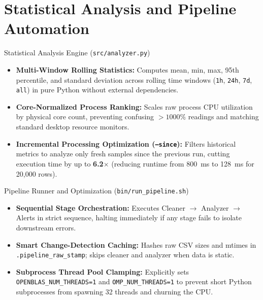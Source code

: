 \section{Statistical Analysis and Pipeline Automation}

\begin{frame}{Statistical Analysis Engine (\texttt{src/analyzer.py})}
    \begin{itemize}
        \setlength{\itemsep}{10pt}
        \item \textbf{Multi-Window Rolling Statistics:} Computes mean, min, max, 95th percentile, and standard deviation across rolling time windows (\texttt{1h}, \texttt{24h}, \texttt{7d}, \texttt{all}) in pure Python without external dependencies.
        \item \textbf{Core-Normalized Process Ranking:} Scales raw process CPU utilization by physical core count, preventing confusing $>1000\%$ readings and matching standard desktop resource monitors.
        \item \textbf{Incremental Processing Optimization (\texttt{--since}):} Filters historical metrics to analyze only fresh samples since the previous run, cutting execution time by up to \textbf{6.2$\times$} (reducing runtime from 800~ms to 128~ms for 20,000 rows).
    \end{itemize}
\end{frame}

\begin{frame}{Pipeline Runner and Optimization (\texttt{bin/run\_pipeline.sh})}
    \begin{itemize}
        \setlength{\itemsep}{10pt}
        \item \textbf{Sequential Stage Orchestration:} Executes Cleaner $\rightarrow$ Analyzer $\rightarrow$ Alerts in strict sequence, halting immediately if any stage fails to isolate downstream errors.
        \item \textbf{Smart Change-Detection Caching:} Hashes raw CSV sizes and mtimes in \texttt{.pipeline\_raw\_stamp}; skips cleaner and analyzer when data is static.
        \item \textbf{Subprocess Thread Pool Clamping:} Explicitly sets \texttt{OPENBLAS\_NUM\_THREADS=1} and \texttt{OMP\_NUM\_THREADS=1} to prevent short Python subprocesses from spawning 32 threads and churning the CPU.
    \end{itemize}
\end{frame}


